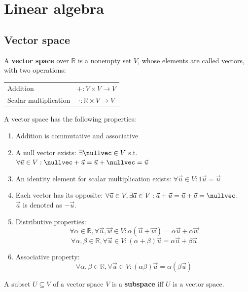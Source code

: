 \chapter{Linear algebra}


\section{Vector space}

A \textbf{vector space} over $\mathbb{R}$ is a nonempty set $V$, whose elements are called vectors, with two operations: 
\begin{center}
    \begin{tabular}{l c}
        Addition & $+ : V \times V \rightarrow V$ \\
        Scalar multiplication & $\cdot : \mathbb{R} \times V \rightarrow V$
    \end{tabular}
\end{center}
A vector space has the following properties:
\begin{enumerate}
    \item Addition is commutative and associative
    \item A null vector exists: $\exists \nullvec \in V$ s.t. $\forall \vec{u} \in V: \nullvec + \vec{u} = \vec{u} + \nullvec = \vec{u}$
    \item An identity element for scalar multiplication exists: $\forall \vec{u} \in V: 1\vec{u} = \vec{u}$
    \item Each vector has its opposite: $\forall \vec{u} \in V, \exists \vec{a} \in V: \vec{a} + \vec{u} = \vec{u} + \vec{a} = \nullvec$.\\
        $\vec{a}$ is denoted as $-\vec{u}$.
    \item Distributive properties:
        \[ \forall \alpha \in \mathbb{R}, \forall \vec{u}, \vec{w} \in V: \alpha(\vec{u} + \vec{w}) = \alpha \vec{u} + \alpha \vec{w} \]
        \[ \forall \alpha, \beta \in \mathbb{R}, \forall \vec{u} \in V: (\alpha + \beta)\vec{u} = \alpha \vec{u} + \beta \vec{u} \]
    \item Associative property:
        \[ \forall \alpha, \beta \in \mathbb{R}, \forall \vec{u} \in V: (\alpha \beta)\vec{u} = \alpha (\beta \vec{u}) \]
\end{enumerate}
%
A subset $U \subseteq V$ of a vector space $V$ is a \textbf{subspace} iff $U$ is a vector space.


